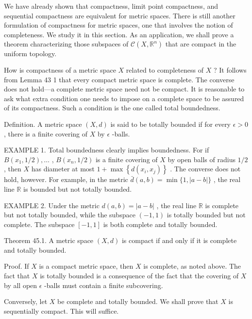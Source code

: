 \documentclass[10pt]{article}
\begin{document}
We have already shown that compactness, limit point compactness, and sequential compactness are equivalent for metric spaces. There is still another formulation of compactness for metric spaces, one that involves the notion of completeness. We study it in this section. As an application, we shall prove a theorem characterizing those subspaces of \(\mathcal{C}\left( {X,{\mathbb{R}}^{n}}\right)\) that are compact in the uniform topology.

How is compactness of a metric space \(X\) related to completeness of \(X\) ? It follows from Lemma 43 1 that every compact metric space is complete. The converse does not hold—a complete metric space need not be compact. It is reasonable to ask what extra condition one needs to impose on a complete space to be assured of its compactness. Such a condition is the one called total boundedness.

Definition. A metric space \(\left( {X,d}\right)\) is said to be totally bounded if for every \(\epsilon  > 0\) , there is a finite covering of \(X\) by \(\epsilon\) -balls.

EXAMPLE 1. Total boundedness clearly implies boundedness. For if \(B\left( {{x}_{1},1/2}\right) ,\ldots\) , \(B\left( {{x}_{n},1/2}\right)\) is a finite covering of \(X\) by open balls of radius \(1/2\) , then \(X\) has diameter at most \(1 + \max \left\{  {d\left( {{x}_{i},{x}_{j}}\right) }\right\}\) . The converse does not hold, however. For example, in the metric \(\bar{d}\left( {a,b}\right)  = \min \{ 1,\left| {a - b}\right| \}\) , the real line \(\mathbb{R}\) is bounded but not totally bounded.

EXAMPLE 2. Under the metric \(d\left( {a,b}\right)  = \left| {a - b}\right|\) , the real line \(\mathbb{R}\) is complete but not totally bounded, while the subspace \(\left( {-1,1}\right)\) is totally bounded but not complete. The subspace \(\left\lbrack  {-1,1}\right\rbrack\) is both complete and totally bounded.

Theorem 45.1. A metric space \(\left( {X,d}\right)\) is compact if and only if it is complete and totally bounded.

Proof. If \(X\) is a compact metric space, then \(X\) is complete, as noted above. The fact that \(X\) is totally bounded is a consequence of the fact that the covering of \(X\) by all open \(\epsilon\) -balls must contain a finite subcovering.

Conversely, let \(X\) be complete and totally bounded. We shall prove that \(X\) is sequentially compact. This will suffice.
\end{document}
